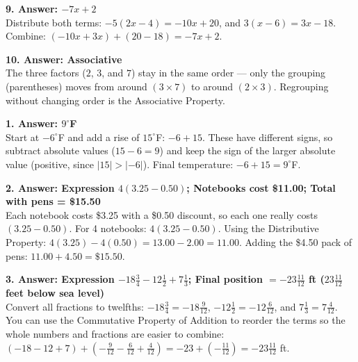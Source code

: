 \documentclass[11pt]{article}
\newcommand{\subhead}[1]{\vspace{6pt}\noindent{\bfseries\color{navy}#1}\par\vspace{4pt}}
\begin{document}
\vspace{6pt}\noindent\textbf{9. Answer: $-7x+2$}\\
\hspace*{1em}Distribute both terms: $-5(2x-4)=-10x+20$, and $3(x-6)=3x-18$. Combine: $(-10x+3x)+(20-18)=-7x+2$.

\vspace{6pt}\noindent\textbf{10. Answer: Associative}\\
\hspace*{1em}The three factors ($2$, $3$, and $7$) stay in the same order --- only the grouping (parentheses) moves from around $(3\times7)$ to around $(2\times3)$. Regrouping without changing order is the Associative Property.

\subhead{Part 4 --- Word Problems}

\noindent\textbf{1. Answer: $9^{\circ}$F}\\
\hspace*{1em}Start at $-6^{\circ}$F and add a rise of $15^{\circ}$F: $-6+15$. These have different signs, so subtract absolute values ($15-6=9$) and keep the sign of the larger absolute value (positive, since $|15|>|-6|$). Final temperature: $-6+15=9^{\circ}$F.

\vspace{6pt}\noindent\textbf{2. Answer: Expression $4(3.25-0.50)$; Notebooks cost \$11.00; Total with pens = \$15.50}\\
\hspace*{1em}Each notebook costs \$3.25 with a \$0.50 discount, so each one really costs $(3.25-0.50)$. For 4 notebooks: $4(3.25-0.50)$. Using the Distributive Property: $4(3.25)-4(0.50)=13.00-2.00=11.00$. Adding the \$4.50 pack of pens: $11.00+4.50=\$15.50$.

\vspace{6pt}\noindent\textbf{3. Answer: Expression $-18\frac{3}{4}-12\frac{1}{2}+7\frac{1}{3}$; Final position $=-23\frac{11}{12}$ ft ($23\frac{11}{12}$ feet below sea level)}\\
\hspace*{1em}Convert all fractions to twelfths: $-18\frac{3}{4}=-18\frac{9}{12}$, $-12\frac{1}{2}=-12\frac{6}{12}$, and $7\frac{1}{3}=7\frac{4}{12}$. You can use the Commutative Property of Addition to reorder the terms so the whole numbers and fractions are easier to combine: $(-18-12+7)+\left(-\frac{9}{12}-\frac{6}{12}+\frac{4}{12}\right)=-23+\left(-\frac{11}{12}\right)=-23\frac{11}{12}$ ft.

\vspace{20pt}
\end{document}
